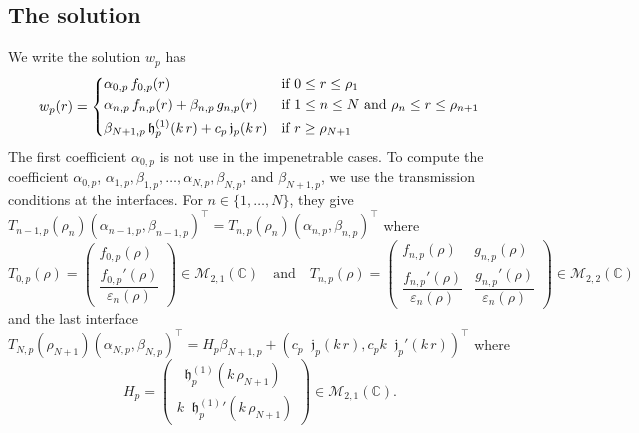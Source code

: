 \documentclass[12pt,a4paper]{article}
\theoremstyle{definition}
\theoremstyle{plain}
\theoremstyle{remark}
\newcommand{\bbC}{\mathbb{C}}
\newcommand{\calM}{\mathcal{M}}
\newcommand{\frj}{\mathop{}\!\mathfrak{j}}
\newcommand{\frh}{\mathop{}\!\mathfrak{h}^{(1)}}
\newcommand{\eps}{\varepsilon}
\begin{document}
\subsection{The solution}

We write the solution $w_p$ has
\begin{equation}
    w_p(r) = \begin{dcases}
        \alpha_{0, p}\, f_{0, p}(r)                              & \text{if } 0 \le r \le \rho_1                                     \\
        \alpha_{n, p}\, f_{n, p}(r) + \beta_{n, p}\, g_{n, p}(r) & \text{if } 1 \le n \le N \text{ and } \rho_n \le r \le \rho_{n+1} \\
        \beta_{N+1, p}\frh_p(k\, r)     + c_p\frj_p(k\, r)       & \text{if } r \ge \rho_{N+1}
    \end{dcases}
\end{equation}
The first coefficient $\alpha_{0, p}$ is not use in the impenetrable cases.
To compute the coefficient $\alpha_{0, p}$, $\alpha_{1, p}, \beta_{1, p}, \ldots, \alpha_{N, p}, \beta_{N, p}$, and $\beta_{N+1, p}$, we use the transmission conditions at the interfaces.
For $n \in \{1, \ldots, N\}$, they give $T_{n-1, p}(\rho_n)(\alpha_{n-1, p}, \beta_{n-1, p})^\intercal = T_{n, p}(\rho_n) (\alpha_{n, p}, \beta_{n, p})^\intercal$ where
\begin{equation}
    T_{0, p}(\rho) = \begin{pmatrix}
        f_{0, p}(\rho) \\[2ex]
        \dfrac{f_{0, p}'(\rho)}{\eps_n(\rho)}
    \end{pmatrix} \in \calM_{2, 1}(\bbC) \quad
    \text{and} \quad
    T_{n, p}(\rho) = \begin{pmatrix}
        f_{n, p}(\rho)                        & g_{n, p}(\rho)                        \\[2ex]
        \dfrac{f_{n, p}'(\rho)}{\eps_n(\rho)} & \dfrac{g_{n, p}'(\rho)}{\eps_n(\rho)}
    \end{pmatrix} \in \calM_{2, 2}(\bbC)
\end{equation}
and the last interface $T_{N, p}(\rho_{N+1})(\alpha_{N, p}, \beta_{N, p})^\intercal = H_p \beta_{N+1, p} + (c_p\frj_p(k\, r), c_p k \frj_p'(k\, r))^\intercal$ where
\begin{equation}
    H_p = \begin{pmatrix}
        \frh_p(k\, \rho_{N+1}) \\[1ex]
        k{\frh_p}'(k\, \rho_{N+1})
    \end{pmatrix} \in \calM_{2, 1}(\bbC).
\end{equation}
\end{document}

